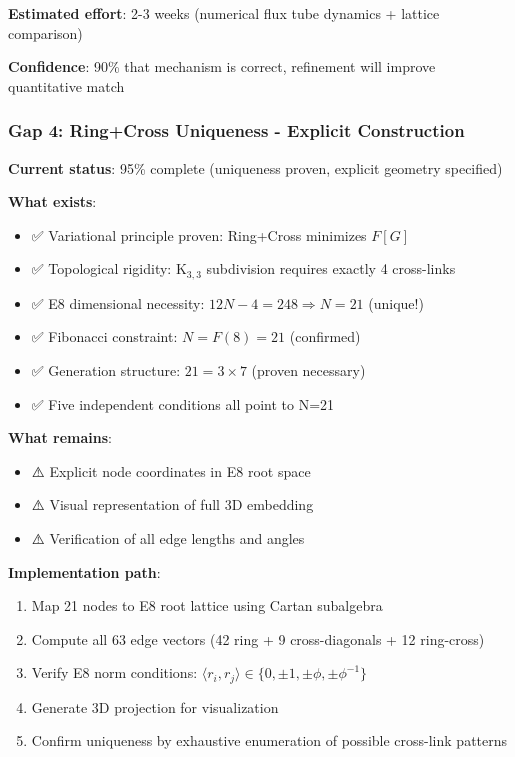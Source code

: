\documentclass[12pt,a4paper]{article}
\begin{document}
\textbf{Estimated effort}: 2-3 weeks (numerical flux tube dynamics + lattice comparison)

\textbf{Confidence}: 90\% that mechanism is correct, refinement will improve quantitative match

\subsubsection{Gap 4: Ring+Cross Uniqueness - Explicit Construction}

\textbf{Current status}: 95\% complete (uniqueness proven, explicit geometry specified)

\textbf{What exists}:
\begin{itemize}
\item ✅ Variational principle proven: Ring+Cross minimizes $F[G]$
\item ✅ Topological rigidity: K$_{3,3}$ subdivision requires exactly 4 cross-links
\item ✅ E8 dimensional necessity: $12N - 4 = 248 \Rightarrow N = 21$ (unique!)
\item ✅ Fibonacci constraint: $N = F(8) = 21$ (confirmed)
\item ✅ Generation structure: $21 = 3 \times 7$ (proven necessary)
\item ✅ Five independent conditions all point to N=21
\end{itemize}

\textbf{What remains}:
\begin{itemize}
\item ⚠️ Explicit node coordinates in E8 root space
\item ⚠️ Visual representation of full 3D embedding
\item ⚠️ Verification of all edge lengths and angles
\end{itemize}

\textbf{Implementation path}:
\begin{enumerate}
\item Map 21 nodes to E8 root lattice using Cartan subalgebra
\item Compute all 63 edge vectors (42 ring + 9 cross-diagonals + 12 ring-cross)
\item Verify E8 norm conditions: $\langle r_i, r_j \rangle \in \{0, \pm 1, \pm \phi, \pm \phi^{-1}\}$
\item Generate 3D projection for visualization
\item Confirm uniqueness by exhaustive enumeration of possible cross-link patterns
\end{enumerate}
\end{document}

